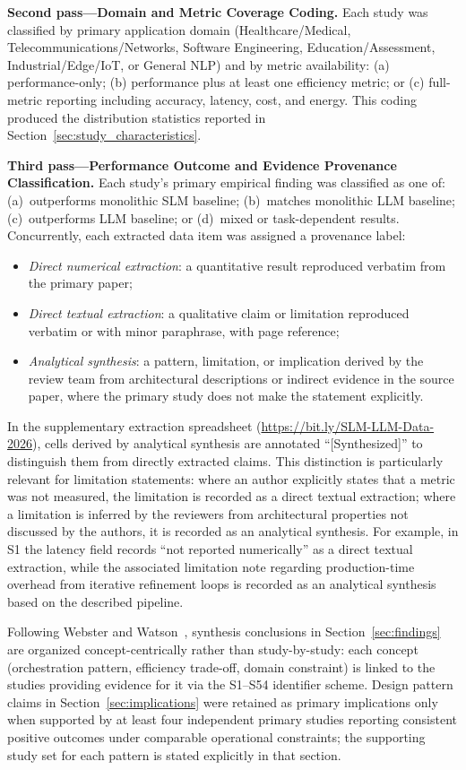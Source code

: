 \textbf{Second pass---Domain and Metric Coverage Coding.} Each study was classified by primary application domain (Healthcare/Medical, Telecommunications/Networks, Software Engineering, Education/Assessment, Industrial/Edge/IoT, or General NLP) and by metric availability: (a) performance-only; (b) performance plus at least one efficiency metric; or (c) full-metric reporting including accuracy, latency, cost, and energy. This coding produced the distribution statistics reported in Section~\ref{sec:study_characteristics}.

\textbf{Third pass---Performance Outcome and Evidence Provenance Classification.} Each study's primary empirical finding was classified as one of: (a)~outperforms monolithic SLM baseline; (b)~matches monolithic LLM baseline; (c)~outperforms LLM baseline; or (d)~mixed or task-dependent results. Concurrently, each extracted data item was assigned a provenance label:
\begin{itemize}
    \item \textit{Direct numerical extraction}: a quantitative result reproduced verbatim from the primary paper;
    \item \textit{Direct textual extraction}: a qualitative claim or limitation reproduced verbatim or with minor paraphrase, with page reference;
    \item \textit{Analytical synthesis}: a pattern, limitation, or implication derived by the review team from architectural descriptions or indirect evidence in the source paper, where the primary study does not make the statement explicitly.
\end{itemize}
In the supplementary extraction spreadsheet (\url{https://bit.ly/SLM-LLM-Data-2026}), cells derived by analytical synthesis are annotated ``[Synthesized]'' to distinguish them from directly extracted claims. This distinction is particularly relevant for limitation statements: where an author explicitly states that a metric was not measured, the limitation is recorded as a direct textual extraction; where a limitation is inferred by the reviewers from architectural properties not discussed by the authors, it is recorded as an analytical synthesis. For example, in S1 the latency field records ``not reported numerically'' as a direct textual extraction, while the associated limitation note regarding production-time overhead from iterative refinement loops is recorded as an analytical synthesis based on the described pipeline.

Following Webster and Watson~\cite{webstonwatson2002}, synthesis conclusions in Section~\ref{sec:findings} are organized concept-centrically rather than study-by-study: each concept (orchestration pattern, efficiency trade-off, domain constraint) is linked to the studies providing evidence for it via the S1--S54 identifier scheme. Design pattern claims in Section~\ref{sec:implications} were retained as primary implications only when supported by at least four independent primary studies reporting consistent positive outcomes under comparable operational constraints; the supporting study set for each pattern is stated explicitly in that section.
